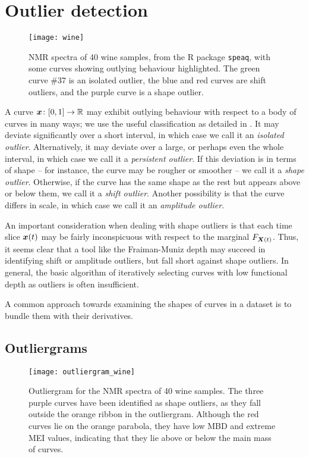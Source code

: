 \section{Outlier detection}

\begin{figure}
    \centering
    \texttt{[image: wine]}
    \caption{
        NMR spectra of 40 wine samples, from the R package \texttt{speaq},
        with some curves showing outlying behaviour highlighted.
        The green curve \#37 is an isolated outlier, the blue and red curves
        are shift outliers, and the purple curve is a shape outlier.
    }
    \label{fig:wine}
\end{figure}

A curve $\bm{x}\colon [0, 1] \to \mathbb{R}$ may exhibit outlying behaviour with respect
to a body of curves in many ways; we use the useful classification as detailed
in \textcite{hubert-rousseeuw-segeart-2015}.
It may deviate significantly over a short interval, in which case we call it
an \emph{isolated outlier}.
Alternatively, it may deviate over a large, or perhaps even the whole
interval, in which case we call it a \emph{persistent outlier}.
If this deviation is in terms of shape -- for instance, the curve may be
rougher or smoother -- we call it a \emph{shape outlier}.
Otherwise, if the curve has the same shape as the rest but appears above or
below them, we call it a \emph{shift outlier}.
Another possibility is that the curve differs in scale, in which case we call
it an \emph{amplitude outlier}.

An important consideration when dealing with shape outliers is that each time
slice $\bm{x}(t)$ may be fairly inconspicuous with respect to the marginal
$F_{\bm{X}(t)}$.
Thus, it seems clear that a tool like the Fraiman-Muniz depth may succeed in
identifying shift or amplitude outliers, but fall short against shape
outliers.
In general, the basic algorithm of iteratively selecting curves with low
functional depth as outliers is often insufficient.

A common approach towards examining the shapes of curves in a dataset is to
bundle them with their derivatives.


\subsection{Outliergrams}

\begin{figure}
    \centering
    \texttt{[image: outliergram\_wine]}
    \caption{
        Outliergram for the NMR spectra of 40 wine samples.
        The three purple curves have been identified as shape outliers, as
        they fall outside the orange ribbon in the outliergram.
        Although the red curves lie on the orange parabola, they have low MBD
        and extreme MEI values, indicating that they lie above or below the
        main mass of curves.
    }
    \label{fig:outliergram_wine}
\end{figure}


